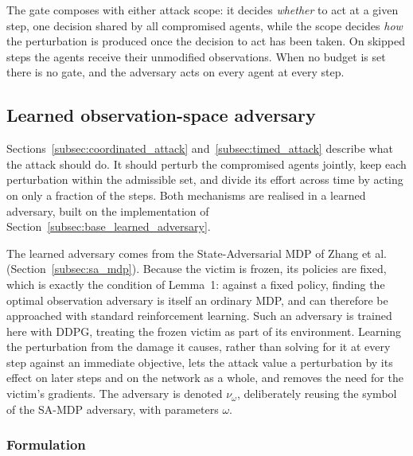The gate composes with either attack scope: it decides \emph{whether} to act at a
given step, one decision shared by all compromised agents, while the scope decides
\emph{how} the perturbation is produced once the decision to act has been taken. On
skipped steps the agents receive their unmodified observations. When no budget is set
there is no gate, and the adversary acts on every agent at every step.

\subsection{Learned observation-space adversary}
\label{subsec:learned_adversary}

Sections~\ref{subsec:coordinated_attack} and~\ref{subsec:timed_attack} describe what
the attack should do. It should perturb the compromised agents jointly, keep each
perturbation within the admissible set, and divide its effort across time by acting
on only a fraction of the steps. Both mechanisms are realised in a learned adversary,
built on the implementation of Section~\ref{subsec:base_learned_adversary}.

The learned adversary comes from the State-Adversarial MDP of Zhang et
al.~\cite{zhang2020robust} (Section~\ref{subsec:sa_mdp}). Because the victim is frozen,
its policies are fixed, which is exactly the condition of Lemma~1: against a fixed
policy, finding the optimal observation adversary is itself an ordinary MDP, and can
therefore be approached with standard reinforcement learning. Such an adversary is
trained here with DDPG, treating the frozen victim as part of its environment. Learning
the perturbation from the damage it causes, rather than solving for it at every step
against an immediate objective, lets the attack value a perturbation by its effect on
later steps and on the network as a whole, and removes the need for the victim's
gradients. The adversary is denoted $\nu_\omega$,
deliberately reusing the symbol of the SA-MDP adversary, with parameters $\omega$.

\subsubsection*{Formulation}

